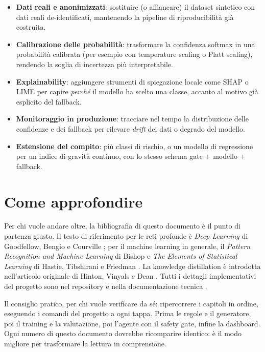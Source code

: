 \begin{itemize}
  \item \textbf{Dati reali e anonimizzati}: sostituire (o affiancare) il
        dataset sintetico con dati reali de-identificati, mantenendo la
        pipeline di riproducibilità già costruita.
  \item \textbf{Calibrazione delle probabilità}: trasformare la confidenza
        softmax in una probabilità calibrata (per esempio con temperature
        scaling o Platt scaling), rendendo la soglia di incertezza più
        interpretabile.
  \item \textbf{Explainability}: aggiungere strumenti di spiegazione
        locale come SHAP o LIME per capire \emph{perché} il modello ha
        scelto una classe, accanto al motivo già esplicito del fallback.
  \item \textbf{Monitoraggio in produzione}: tracciare nel tempo la
        distribuzione delle confidenze e dei fallback per rilevare
        \emph{drift} dei dati o degrado del modello.
  \item \textbf{Estensione del compito}: più classi di rischio, o un
        modello di regressione per un indice di gravità continuo, con lo
        stesso schema gate + modello + fallback.
\end{itemize}

\section{Come approfondire}\label{sec:approfondire}

Per chi vuole andare oltre, la bibliografia di questo documento è il punto
di partenza giusto. Il testo di riferimento per le reti profonde è
\emph{Deep Learning} di Goodfellow, Bengio e Courville
\cite{goodfellow2016deep}; per il machine learning in generale, il
\emph{Pattern Recognition and Machine Learning} di Bishop
\cite{bishop2006pattern} e \emph{The Elements of Statistical Learning} di
Hastie, Tibshirani e Friedman \cite{hastie2009elements}. La knowledge
distillation è introdotta nell'articolo originale di Hinton, Vinyals e
Dean \cite{hinton2015distilling}. Tutti i dettagli implementativi del
progetto sono nel repository e nella documentazione tecnica
\cite{progetto2026}.

Il consiglio pratico, per chi vuole verificare da sé: ripercorrere i
capitoli in ordine, eseguendo i comandi del progetto a ogni tappa. Prima
le regole e il generatore, poi il training e la valutazione, poi l'agente
con il safety gate, infine la dashboard. Ogni numero di questo documento
dovrebbe ricomparire identico: è il modo migliore per trasformare la
lettura in comprensione.

